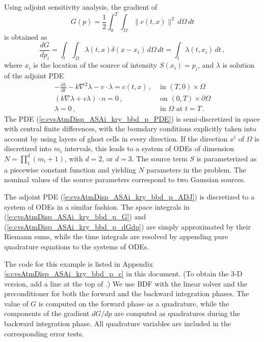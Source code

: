 Using adjoint sensitivity analysis, the gradient of
\begin{equation}\label{e:cvsAtmDisp_ASAi_kry_bbd_p_G}
  G(p) = \frac{1}{2} \int_0^T \int_\Omega \| c(t,x) \|^2 \, d\Omega \, dt
\end{equation}
is obtained as
\begin{equation}\label{e:cvsAtmDisp_ASAi_kry_bbd_p_dGdp}
  \frac{dG}{dp_i} = \int_t \int_\Omega \lambda(t,x) \delta(x-x_i) \, d\Omega \, dt
  = \int_t \lambda(t,x_i) \, dt \, ,
\end{equation}
where $x_i$ is the location of the source of intensity $S(x_i)=p_i$, and $\lambda$
is solution of the adjoint PDE
\begin{equation}\label{e:cvsAtmDisp_ASAi_kry_bbd_p_ADJ}
  \begin{split}
    - \frac{\partial\lambda}{\partial t} - k \nabla^2\lambda - v \cdot \lambda = c(t,x)  \, ,
    &\text{ in } (T,0) \times \Omega \\
    (k \nabla\lambda + v \lambda) \cdot n = 0 \, ,
    &\text{ on } (0,T) \times \partial\Omega \\
    \lambda = 0 \, ,
    &\text{ in } \Omega \text{ at } t = T \, .
  \end{split}
\end{equation}
The PDE (\ref{e:cvsAtmDisp_ASAi_kry_bbd_p_PDE}) is semi-discretized in space with 
central finite differences, with the boundary conditions explicitly taken into account 
by using layers of ghost cells in every direction. If the direction $x^i$ of $\Omega$
is discretized into $m_i$ intervals, this leads to a system of ODEs of dimension 
$N = \prod_1^d (m_i+1)$, with $d=2$, or $d=3$.
The source term $S$ is parameterized as a piecewise constant function and yielding
$N$ parameters in the problem. The nominal values of the source parameters correspond
to two Gaussian sources.

The adjoint PDE (\ref{e:cvsAtmDisp_ASAi_kry_bbd_p_ADJ}) is discretized to a system of
ODEs in a similar fashion.  The space integrals in (\ref{e:cvsAtmDisp_ASAi_kry_bbd_p_G})
and (\ref{e:cvsAtmDisp_ASAi_kry_bbd_p_dGdp}) are simply approximated by their
Riemann sums, while the time integrals are resolved by appending pure quadrature
equations to the systems of ODEs.

The code for this example is listed in Appendix \ref{s:cvsAtmDisp_ASAi_kry_bbd_p_c}
in this document.
(To obtain the 3-D version, add a line  at the top of .)  
We use BDF with the {\cvspgmr} linear solver and the {\cvbbdpre} preconditioner for
both the forward and the backward integration phases. The value of $G$ is computed
on the forward phase as a quadrature, while the components of the gradient $dG/dp$
are computed as quadratures during the backward integration phase.  All quadrature
variables are included in the corresponding error tests.

